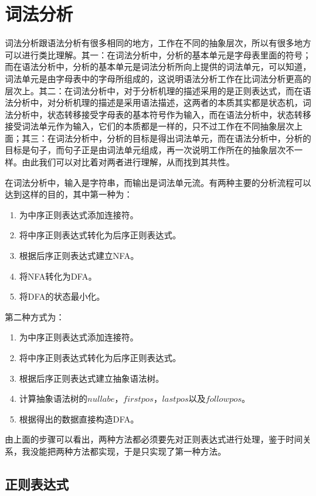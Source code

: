 \chapter{词法分析}

词法分析跟语法分析有很多相同的地方，工作在不同的抽象层次，所以有很多地方可以进行类比理解。其一：在词法分析中，分析的基本单元是字母表里面的符号；而在语法分析中，分析的基本单元是词法分析所向上提供的词法单元，可以知道，词法单元是由字母表中的字母所组成的，这说明语法分析工作在比词法分析更高的层次上。其二：在词法分析中，对于分析机理的描述采用的是正则表达式，而在语法分析中，对分析机理的描述是采用语法描述，这两者的本质其实都是状态机，词法分析中，状态转移接受字母表的基本符号作为输入，而在语法分析中，状态转移接受词法单元作为输入，它们的本质都是一样的，只不过工作在不同抽象层次上面；其三：在词法分析中，分析的目标是得出词法单元，而在语法分析中，分析的目标是句子，而句子正是由词法单元组成，再一次说明工作所在的抽象层次不一样。由此我们可以对比着对两者进行理解，从而找到其共性。

在词法分析中，输入是字符串，而输出是词法单元流。有两种主要的分析流程可以达到这样的目的，其中第一种为：

\begin{enumerate}
    \item 为中序正则表达式添加连接符。
    \item 将中序正则表达式转化为后序正则表达式。
    \item 根据后序正则表达式建立NFA。
    \item 将NFA转化为DFA。
    \item 将DFA的状态最小化。
\end{enumerate}

第二种方式为：

\begin{enumerate}
    \item 为中序正则表达式添加连接符。
    \item 将中序正则表达式转化为后序正则表达式。
    \item 根据后序正则表达式建立抽象语法树。
    \item 计算抽象语法树的$nullabe$，$firstpos$，$lastpos$以及$followpos$。
    \item 根据得出的数据直接构造DFA。
\end{enumerate}

由上面的步骤可以看出，两种方法都必须要先对正则表达式进行处理，鉴于时间关系，我没能把两种方法都实现，于是只实现了第一种方法。

\section{正则表达式}

